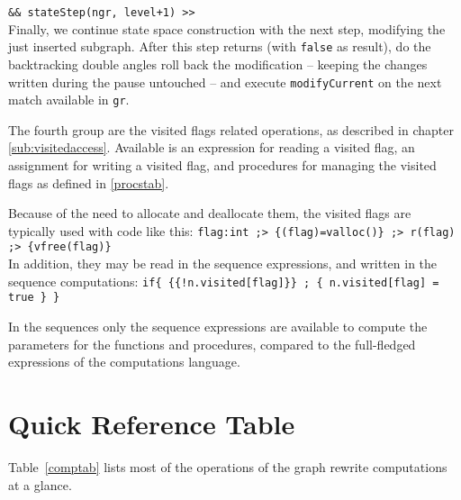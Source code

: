 \begin{example}
\verb#&& stateStep(ngr, level+1) >>#\\
Finally, we continue state space construction with the next step, modifying the just inserted subgraph.
After this step returns (with \texttt{false} as result), do the backtracking double angles roll back the modification -- keeping the changes written during the pause untouched -- and execute \texttt{modifyCurrent} on the next match available in \texttt{gr}.
\end{example}

The fourth group are the visited flags related operations,
as described in chapter \ref{sub:visitedaccess}.
Available is an expression for reading a visited flag, an assignment for writing a visited flag, and procedures for managing the visited flags as defined in \ref{procstab}.

\begin{example}
Because of the need to allocate and deallocate them, the visited flags are typically used with code like this:
\verb#flag:int ;> {(flag)=valloc()} ;> r(flag) ;> {vfree(flag)}#\\
In addition, they may be read in the sequence expressions, and written in the sequence computations:
\verb#if{ {{!n.visited[flag]}} ; { n.visited[flag] = true } }#
\end{example}

In the sequences only the sequence expressions are available to compute the parameters for the functions and procedures, compared to the full-fledged expressions of the computations language.


\section{Quick Reference Table}

Table~\ref{comptab} lists most of the operations of the graph rewrite computations at a glance.

